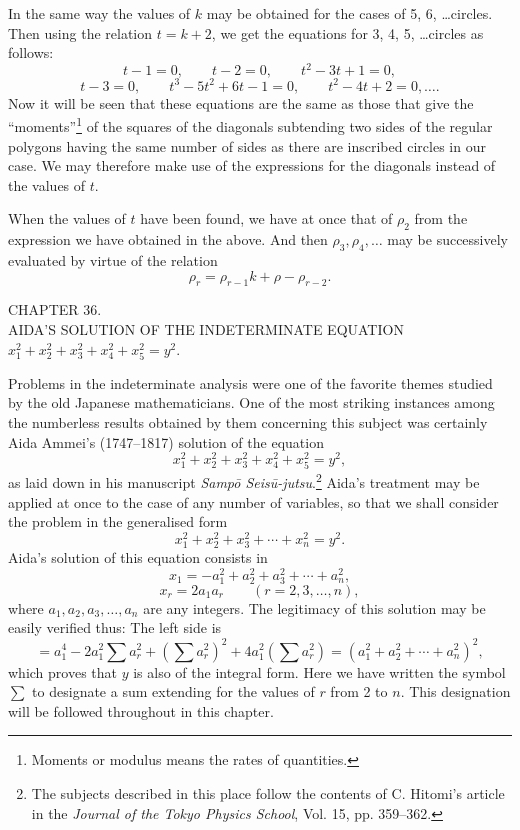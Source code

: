 \documentclass[11pt]{article}
\newcommand{\scanpage}[2]{\clearpage\setcounter{footnote}{0}\noindent{\footnotesize\color{gray}PDF page #1 · #2}\par\medskip}
\newcommand{\scanfooter}{}
\begin{document}
In the same way the values of $k$ may be obtained for the cases of 5, 6, \ldots circles. Then using the relation $t=k+2$, we get the equations for 3, 4, 5, \ldots circles as follows:
\[
t-1=0,\qquad t-2=0,\qquad t^2-3t+1=0,
\]
\[
t-3=0,\qquad t^3-5t^2+6t-1=0,\qquad t^2-4t+2=0,\ldots.
\]
Now it will be seen that these equations are the same as those that give the ``moments''\footnote{Moments or modulus means the rates of quantities.} of the squares of the diagonals subtending two sides of the regular polygons having the same number of sides as there are inscribed circles in our case. We may therefore make use of the expressions for the diagonals instead of the values of $t$.

When the values of $t$ have been found, we have at once that of $\rho_2$ from the expression we have obtained in the above. And then $\rho_3,\rho_4,\ldots$ may be successively evaluated by virtue of the relation
\[
\rho_r=\rho_{r-1}k+\rho-\rho_{r-2}.
\]
\scanfooter

\scanpage{0261}{Chapter 36, printed page 247}
\begin{center}
CHAPTER 36.\\[1mm]
AIDA'S SOLUTION OF THE INDETERMINATE EQUATION\\
$x_1^2+x_2^2+x_3^2+x_4^2+x_5^2=y^2$.
\end{center}

Problems in the indeterminate analysis were one of the favorite themes studied by the old Japanese mathematicians. One of the most striking instances among the numberless results obtained by them concerning this subject was certainly Aida Ammei's (1747--1817) solution of the equation
\[
x_1^2+x_2^2+x_3^2+x_4^2+x_5^2=y^2,
\]
as laid down in his manuscript \emph{Sampō Seisū-jutsu}.\footnote{The subjects described in this place follow the contents of C. Hitomi's article in the \emph{Journal of the Tokyo Physics School}, Vol. 15, pp. 359--362.} Aida's treatment may be applied at once to the case of any number of variables, so that we shall consider the problem in the generalised form
\[
x_1^2+x_2^2+x_3^2+\cdots+x_n^2=y^2.
\]
Aida's solution of this equation consists in
\[
x_1=-a_1^2+a_2^2+a_3^2+\cdots+a_n^2,
\]
\[
x_r=2a_1a_r\qquad(r=2,3,\ldots,n),
\]
where $a_1,a_2,a_3,\ldots,a_n$ are any integers. The legitimacy of this solution may be easily verified thus: The left side is
\[
=a_1^4-2a_1^2\sum a_r^2+(\sum a_r^2)^2+4a_1^2(\sum a_r^2)
=(a_1^2+a_2^2+\cdots+a_n^2)^2,
\]
which proves that $y$ is also of the integral form. Here we have written the symbol $\sum$ to designate a sum extending for the values of $r$ from 2 to $n$. This designation will be followed throughout in this chapter.
\end{document}
